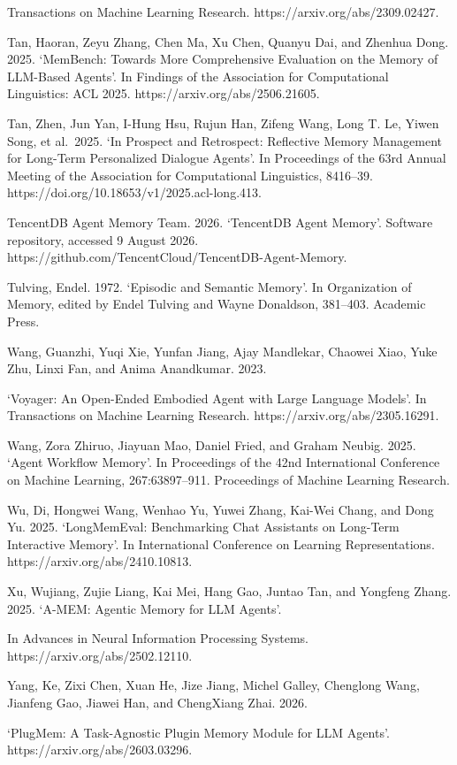\documentclass[
  english,
  a4paper,
  DIV=11,
  numbers=noendperiod]{scrreprt}
\begin{document}
Transactions on Machine Learning Research.
https://arxiv.org/abs/2309.02427.

Tan, Haoran, Zeyu Zhang, Chen Ma, Xu Chen, Quanyu Dai, and Zhenhua Dong.
2025. `MemBench: Towards More Comprehensive Evaluation on the Memory of
LLM-Based Agents'. In Findings of the Association for Computational
Linguistics: ACL 2025. https://arxiv.org/abs/2506.21605.

Tan, Zhen, Jun Yan, I-Hung Hsu, Rujun Han, Zifeng Wang, Long T. Le,
Yiwen Song, et al.~2025. `In Prospect and Retrospect: Reflective Memory
Management for Long-Term Personalized Dialogue Agents'. In Proceedings
of the 63rd Annual Meeting of the Association for Computational
Linguistics, 8416--39. https://doi.org/10.18653/v1/2025.acl-long.413.

TencentDB Agent Memory Team. 2026. `TencentDB Agent Memory'. Software
repository, accessed 9 August 2026.
https://github.com/TencentCloud/TencentDB-Agent-Memory.

Tulving, Endel. 1972. `Episodic and Semantic Memory'. In Organization of
Memory, edited by Endel Tulving and Wayne Donaldson, 381--403. Academic
Press.

Wang, Guanzhi, Yuqi Xie, Yunfan Jiang, Ajay Mandlekar, Chaowei Xiao,
Yuke Zhu, Linxi Fan, and Anima Anandkumar. 2023.

`Voyager: An Open-Ended Embodied Agent with Large Language Models'. In
Transactions on Machine Learning Research.
https://arxiv.org/abs/2305.16291.

Wang, Zora Zhiruo, Jiayuan Mao, Daniel Fried, and Graham Neubig. 2025.
`Agent Workflow Memory'. In Proceedings of the 42nd International
Conference on Machine Learning, 267:63897--911. Proceedings of Machine
Learning Research.

Wu, Di, Hongwei Wang, Wenhao Yu, Yuwei Zhang, Kai-Wei Chang, and Dong
Yu. 2025. `LongMemEval: Benchmarking Chat Assistants on Long-Term
Interactive Memory'. In International Conference on Learning
Representations. https://arxiv.org/abs/2410.10813.

Xu, Wujiang, Zujie Liang, Kai Mei, Hang Gao, Juntao Tan, and Yongfeng
Zhang. 2025. `A-MEM: Agentic Memory for LLM Agents'.

In Advances in Neural Information Processing Systems.
https://arxiv.org/abs/2502.12110.

Yang, Ke, Zixi Chen, Xuan He, Jize Jiang, Michel Galley, Chenglong Wang,
Jianfeng Gao, Jiawei Han, and ChengXiang Zhai. 2026.

`PlugMem: A Task-Agnostic Plugin Memory Module for LLM Agents'.
https://arxiv.org/abs/2603.03296.
\end{document}
